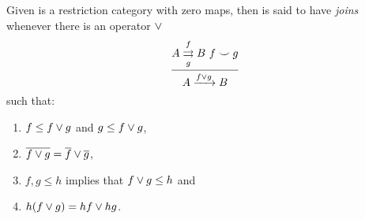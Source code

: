 \begin{definition}\label{def:joins}
  Given \R is a restriction category with zero maps, then \R is said to have
  \emph{joins}\cite{guox:thesis} whenever there is an operator $\vee$
  \[
    \infer{A\xrightarrow{f\join g} B}
      {A\overset{f}{\underset{g}{\rightrightarrows}}B\ f\compatible g}
  \]
  such that:
  \begin{enumerate}[{(}i{)}]
    \item $f \le f \vee g$ and $g \le f \vee g$,\label{defitem:join1}
    \item $\overline{f\vee g} = \overline{f}\vee \overline{g}$,\label{defitem:join2}
    \item $f,g \le h$ implies that $f\vee g \le h$ and\label{defitem:join3}
    \item $h(f\vee g) = h f \vee h g$.\label{defitem:join4}
  \end{enumerate}
\end{definition}

